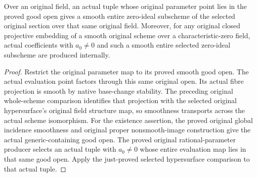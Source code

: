 \begin{corollary}
\label{cor:kn-nadel-bertini-good-selected-hypersurface}
\leanok
{}
Over an original field, an actual tuple whose original parameter point
lies in the proved good open gives a smooth entire zero-ideal subscheme
of the selected original section over that same original field. Moreover,
for any original closed projective embedding of a smooth original scheme
over a characteristic-zero field, actual coefficients with $a_0\ne0$
and such a smooth entire selected zero-ideal subscheme are produced
internally.
\end{corollary}
\begin{proof}
Restrict the original parameter map to its proved smooth good open.
The actual evaluation point factors through this same original open.
Its actual fibre projection is smooth by native base-change stability.
The preceding original whole-scheme comparison identifies that projection
with the selected original hypersurface's original field structure map,
so smoothness transports across the actual scheme isomorphism. For the
existence assertion, the proved original global incidence smoothness and
original proper nonsmooth-image construction give the actual
generic-containing good open. The proved original rational-parameter
producer selects an actual tuple with $a_0\ne0$ whose entire evaluation
map lies in that same good open. Apply the just-proved selected
hypersurface comparison to that actual tuple.
\end{proof}
